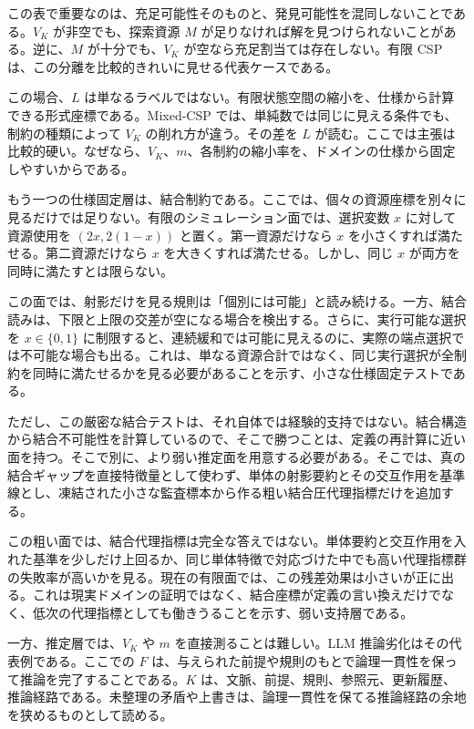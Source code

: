 \documentclass[12pt,a4paper]{article}
\begin{document}
この表で重要なのは、充足可能性そのものと、発見可能性を混同しないことである。\(V_K\) が非空でも、探索資源 \(M\) が足りなければ解を見つけられないことがある。逆に、\(M\) が十分でも、\(V_K\) が空なら充足割当ては存在しない。有限 CSP は、この分離を比較的きれいに見せる代表ケースである。

この場合、\(L\) は単なるラベルではない。有限状態空間の縮小を、仕様から計算できる形式座標である。Mixed-CSP では、単純数では同じに見える条件でも、制約の種類によって \(V_K\) の削れ方が違う。その差を \(L\) が読む。ここでは主張は比較的硬い。なぜなら、\(V_K\)、\(m\)、各制約の縮小率を、ドメインの仕様から固定しやすいからである。

もう一つの仕様固定層は、結合制約である。ここでは、個々の資源座標を別々に見るだけでは足りない。有限のシミュレーション面では、選択変数 \(x\) に対して資源使用を \((2x,2(1-x))\) と置く。第一資源だけなら \(x\) を小さくすれば満たせる。第二資源だけなら \(x\) を大きくすれば満たせる。しかし、同じ \(x\) が両方を同時に満たすとは限らない。

この面では、射影だけを見る規則は「個別には可能」と読み続ける。一方、結合読みは、下限と上限の交差が空になる場合を検出する。さらに、実行可能な選択を \(x\in\{0,1\}\) に制限すると、連続緩和では可能に見えるのに、実際の端点選択では不可能な場合も出る。これは、単なる資源合計ではなく、同じ実行選択が全制約を同時に満たせるかを見る必要があることを示す、小さな仕様固定テストである。

ただし、この厳密な結合テストは、それ自体では経験的支持ではない。結合構造から結合不可能性を計算しているので、そこで勝つことは、定義の再計算に近い面を持つ。そこで別に、より弱い推定面を用意する必要がある。そこでは、真の結合ギャップを直接特徴量として使わず、単体の射影要約とその交互作用を基準線とし、凍結された小さな監査標本から作る粗い結合圧代理指標だけを追加する。

この粗い面では、結合代理指標は完全な答えではない。単体要約と交互作用を入れた基準を少しだけ上回るか、同じ単体特徴で対応づけた中でも高い代理指標群の失敗率が高いかを見る。現在の有限面では、この残差効果は小さいが正に出る。これは現実ドメインの証明ではなく、結合座標が定義の言い換えだけでなく、低次の代理指標としても働きうることを示す、弱い支持層である。

一方、推定層では、\(V_K\) や \(m\) を直接測ることは難しい。LLM 推論劣化はその代表例である。ここでの \(F\) は、与えられた前提や規則のもとで論理一貫性を保って推論を完了することである。\(K\) は、文脈、前提、規則、参照元、更新履歴、推論経路である。未整理の矛盾や上書きは、論理一貫性を保てる推論経路の余地を狭めるものとして読める。
\end{document}
